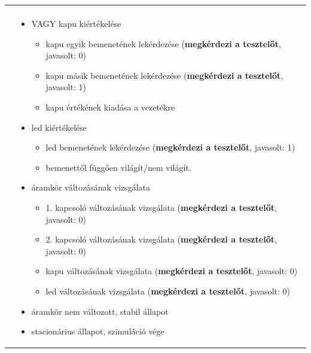 \begin{longtable}{| l | p{12cm} |}
\begin{itemize}
\begin{itemize}
\begin{itemize}
\end{itemize}
\end{itemize}
\end{itemize}
\tabularnewline
& 

\begin{itemize}
\renewcommand{\labelitemi}{*}
\renewcommand{\labelitemii}{$\cdot$}
\setlength{\itemsep}{0cm}%
\setlength{\parskip}{0cm}%
\setlength{\itemindent}{1.5em}%
\item VAGY kapu kiértékelése
	\begin{itemize}
	\setlength{\itemsep}{0cm}%
	\setlength{\parskip}{0cm}%
	\setlength{\itemindent}{1em}%
		\item kapu egyik bemenetének lekérdezése (\textbf{megkérdezi a tesztelőt}, javasolt: 0)
		\item kapu másik bemenetének lekérdezése (\textbf{megkérdezi a tesztelőt}, javasolt: 1)
	\item kapu értékének kiadása a vezetékre
	\end{itemize}
	\item led kiértékelése
	\begin{itemize}
	\setlength{\itemsep}{0cm}%
	\setlength{\parskip}{0cm}%
	\setlength{\itemindent}{1em}%
		\item led bemenetének lekérdezése (\textbf{megkérdezi a tesztelőt}, javasolt: 1)
		\item bemenettől függően világít/nem világít.
	\end{itemize}
\end{itemize}

\begin{itemize}
\renewcommand{\labelitemi}{--}
\renewcommand{\labelitemii}{*}
\setlength{\itemsep}{0cm}%
\setlength{\parskip}{0cm}%
\setlength{\itemindent}{0em}%
\item áramkör változásának vizsgálata
\begin{itemize}
\setlength{\itemsep}{0cm}%
\setlength{\parskip}{0cm}%
\setlength{\itemindent}{0em}%
	\item 1. kapcsoló változásának vizsgálata (\textbf{megkérdezi a tesztelőt}, javasolt: 0)
	\item 2. kapcsoló változásának vizsgálata (\textbf{megkérdezi a tesztelőt}, javasolt: 0)
	\item kapu változásának vizsgálata (\textbf{megkérdezi a tesztelőt}, javasolt: 0)
	\item led változásának vizsgálata (\textbf{megkérdezi a tesztelőt}, javasolt: 0)
\end{itemize}
\item áramkör nem változott, stabil állapot
\item stacionárius állapot, szimuláció vége
\end{itemize}
\vspace{-15pt}\tabularnewline
	\hline
	\end{longtable}


